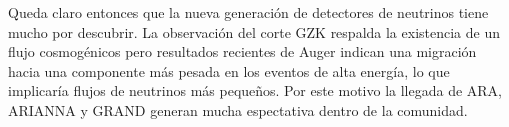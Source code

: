 	Queda claro entonces que la nueva generaci\'on de detectores de neutrinos tiene mucho por descubrir.
	La observaci\'on del corte GZK respalda la existencia de un flujo cosmog\'enicos pero resultados recientes de Auger indican una migraci\'on hacia una componente m\'as pesada en los eventos de alta energ\'ia, lo que implicar\'ia flujos de neutrinos m\'as peque\~nos.
	Por este motivo la llegada de ARA, ARIANNA y GRAND generan mucha espectativa dentro de la comunidad.
	
% 	
	